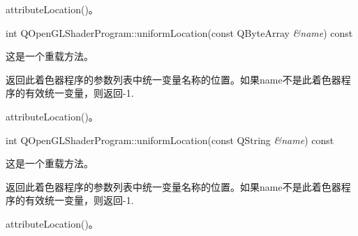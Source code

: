 \begin{seeAlso}
attributeLocation()。
\end{seeAlso}

int QOpenGLShaderProgram::uniformLocation(const QByteArray \emph{\&name}) const

这是一个重载方法。

返回此着色器程序的参数列表中统一变量名称的位置。如果name不是此着色器程序的有效统一变量，则返回-1.

\begin{seeAlso}
attributeLocation()。
\end{seeAlso}

int QOpenGLShaderProgram::uniformLocation(const QString \emph{\&name}) const

这是一个重载方法。

返回此着色器程序的参数列表中统一变量名称的位置。如果name不是此着色器程序的有效统一变量，则返回-1.

\begin{seeAlso}
attributeLocation()。
\end{seeAlso}